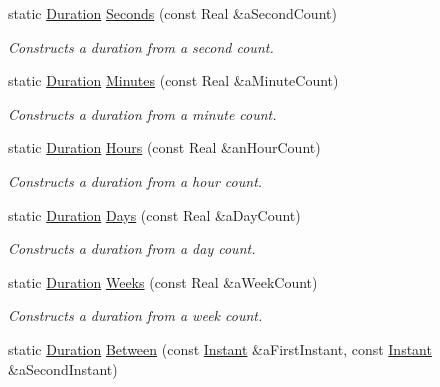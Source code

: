 \begin{DoxyCompactItemize}
static \hyperlink{classlibrary_1_1physics_1_1time_1_1_duration}{Duration} \hyperlink{classlibrary_1_1physics_1_1time_1_1_duration_ae10891c94a1b2278c444cb44b37132f1}{Seconds} (const Real \&a\+Second\+Count)
\begin{DoxyCompactList}\small\item\em Constructs a duration from a second count. \end{DoxyCompactList}\item 
static \hyperlink{classlibrary_1_1physics_1_1time_1_1_duration}{Duration} \hyperlink{classlibrary_1_1physics_1_1time_1_1_duration_ad7171befa3075e796bfb02a7542dacdd}{Minutes} (const Real \&a\+Minute\+Count)
\begin{DoxyCompactList}\small\item\em Constructs a duration from a minute count. \end{DoxyCompactList}\item 
static \hyperlink{classlibrary_1_1physics_1_1time_1_1_duration}{Duration} \hyperlink{classlibrary_1_1physics_1_1time_1_1_duration_aadef86b1b803b8764380ef623f99ce95}{Hours} (const Real \&an\+Hour\+Count)
\begin{DoxyCompactList}\small\item\em Constructs a duration from a hour count. \end{DoxyCompactList}\item 
static \hyperlink{classlibrary_1_1physics_1_1time_1_1_duration}{Duration} \hyperlink{classlibrary_1_1physics_1_1time_1_1_duration_abf1323fa113b5203747ce9aec5c969fc}{Days} (const Real \&a\+Day\+Count)
\begin{DoxyCompactList}\small\item\em Constructs a duration from a day count. \end{DoxyCompactList}\item 
static \hyperlink{classlibrary_1_1physics_1_1time_1_1_duration}{Duration} \hyperlink{classlibrary_1_1physics_1_1time_1_1_duration_ae9d507f6cbb36902529b28d3721507c1}{Weeks} (const Real \&a\+Week\+Count)
\begin{DoxyCompactList}\small\item\em Constructs a duration from a week count. \end{DoxyCompactList}\item 
static \hyperlink{classlibrary_1_1physics_1_1time_1_1_duration}{Duration} \hyperlink{classlibrary_1_1physics_1_1time_1_1_duration_a7d2654965a46c6eff9d331ad8b0d9b1f}{Between} (const \hyperlink{classlibrary_1_1physics_1_1time_1_1_instant}{Instant} \&a\+First\+Instant, const \hyperlink{classlibrary_1_1physics_1_1time_1_1_instant}{Instant} \&a\+Second\+Instant)

\end{DoxyCompactItemize}
